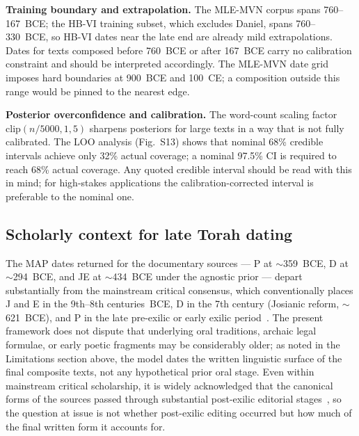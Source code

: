 \documentclass[10pt,letterpaper]{article}
\newcommand{\mvn}{MLE-MVN}
\newcommand{\hbvi}{HB-VI}
\begin{document}
\textbf{Training boundary and extrapolation.}  The \mvn{} corpus spans
760--167~BCE; the \hbvi{} training subset, which excludes Daniel, spans
760--330~BCE, so \hbvi{} dates near the late end are already mild
extrapolations.  Dates for texts composed before 760~BCE or
after 167~BCE carry no calibration constraint and should be interpreted
accordingly.  The \mvn{} date grid imposes hard boundaries at 900~BCE
and 100~CE; a composition outside this range would be pinned to the
nearest edge.

\textbf{Posterior overconfidence and calibration.}  The word-count
scaling factor $\mathrm{clip}(n/5000,1,5)$ sharpens posteriors for large
texts in a way that is not fully calibrated.  The LOO analysis
(Fig.~S13) shows that nominal 68\% credible intervals achieve only 32\%
actual coverage; a nominal 97.5\% CI is required to reach 68\% actual
coverage.  Any quoted credible interval should be read with this in mind;
for high-stakes applications the calibration-corrected interval is
preferable to the nominal one.

\subsection*{Scholarly context for late Torah dating}

The MAP dates returned for the documentary sources ---
P at $\sim$359~BCE, D at $\sim$294~BCE, and JE at $\sim$434~BCE under the
agnostic prior --- depart substantially from the mainstream critical
consensus, which conventionally places J and E in the 9th--8th
centuries~BCE, D in the 7th century (Josianic reform, $\sim$621~BCE), and
P in the late pre-exilic or early exilic
period~\cite{Wellhausen1885,Baden2012}.  The present framework does not
dispute that underlying oral traditions, archaic legal formulae, or early
poetic fragments may be considerably older; as noted in the Limitations
section above, the model dates the written linguistic surface of the final
composite texts, not any hypothetical prior oral stage.  Even within
mainstream critical scholarship, it is widely acknowledged that the
canonical forms of the sources passed through substantial post-exilic
editorial stages~\cite{CarrFormation2011,Romer2005}, so the question at
issue is not whether post-exilic editing occurred but how much of the
final written form it accounts for.
\end{document}
